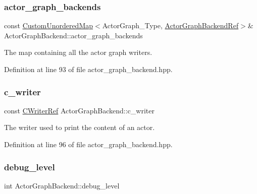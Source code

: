 \subsubsection{\texorpdfstring{actor\+\_\+graph\+\_\+backends}{actor\_graph\_backends}}
{\footnotesize\ttfamily const \hyperlink{custom__map_8hpp_ad1ed68f2ff093683ab1a33522b144adc}{Custom\+Unordered\+Map}$<$Actor\+Graph\+\_\+\+Type, \hyperlink{actor__graph__backend_8hpp_ae30db41c92b2664ac3ed9f9633c49969}{Actor\+Graph\+Backend\+Ref}$>$\& Actor\+Graph\+Backend\+::actor\+\_\+graph\+\_\+backends\hspace{0.3cm}{\ttfamily [protected]}}



The map containing all the actor graph writers. 



Definition at line 93 of file actor\+\_\+graph\+\_\+backend.\+hpp.

\mbox{\label{classActorGraphBackend_a2cb0997768049a912eda90135e53b6d1}} 
\subsubsection{\texorpdfstring{c\+\_\+writer}{c\_writer}}
{\footnotesize\ttfamily const \hyperlink{c__writer_8hpp_a4e9c4dfe17e35f981e27b6dd97f9632c}{C\+Writer\+Ref} Actor\+Graph\+Backend\+::c\+\_\+writer\hspace{0.3cm}{\ttfamily [protected]}}



The writer used to print the content of an actor. 



Definition at line 96 of file actor\+\_\+graph\+\_\+backend.\+hpp.

\mbox{\label{classActorGraphBackend_a31ed80ce88629afbd917ab01d07c3fdf}} 
\subsubsection{\texorpdfstring{debug\+\_\+level}{debug\_level}}
{\footnotesize\ttfamily int Actor\+Graph\+Backend\+::debug\+\_\+level\hspace{0.3cm}{\ttfamily [protected]}}



